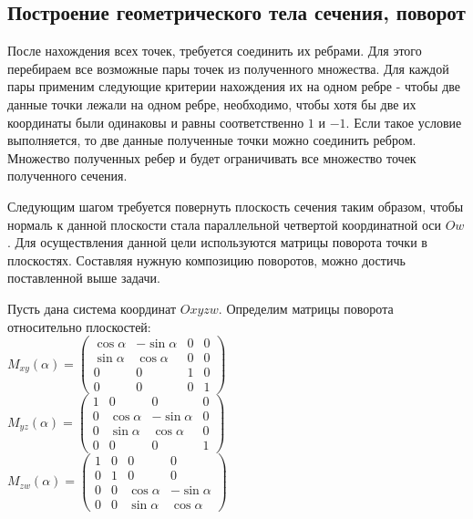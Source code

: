 \documentclass[12pt, a4paper, twoside]{report}
\begin{document}
\subsection{Построение геометрического тела сечения, поворот}
После нахождения всех точек, требуется соединить их ребрами. Для этого перебираем все возможные пары точек из полученного множества. Для каждой пары применим следующие критерии нахождения их на одном ребре - чтобы две данные точки лежали на одном ребре, необходимо, чтобы хотя бы две их координаты были одинаковы и равны соответственно $1$ и $-1$.
Если такое условие выполняется, то две данные полученные точки можно соединить ребром. Множество полученных ребер и будет ограничивать все множество точек полученного сечения.

Следующим шагом требуется повернуть плоскость сечения таким образом, чтобы нормаль к данной плоскости стала параллельной четвертой координатной оси $Ow$. Для осуществления данной цели используются матрицы поворота точки в плоскостях. Составляя нужную композицию поворотов, можно достичь поставленной выше задачи.

Пусть дана система координат $Oxyzw$. Определим матрицы поворота относительно плоскостей:
\\
$
M_{xy}(\alpha)=
\begin{equation}
	\left(
	\begin{array}{cccc}
		\cos \alpha & -\sin \alpha & 0 & 0 \\
		\sin \alpha & \cos \alpha & 0 & 0 \\
		0 & 0 & 1 & 0 \\
		0 & 0 & 0 & 1
	\end{array}\right)
\end{equation}
$
\\ 

$
M_{yz}(\alpha)=
\begin{equation}
	\left(
	\begin{array}{cccc}
		1 & 0 & 0 & 0 \\
		0 & \cos \alpha & -\sin \alpha & 0 \\
		0 & \sin \alpha & \cos \alpha & 0 \\
		0 & 0 & 0 & 1
	\end{array}\right)
\end{equation}
$
\\

$
M_{zw}(\alpha)=
	\begin{equation}
	\left(
	\begin{array}{cccc}
																				1 & 0 & 0 & 0 \\
																				0 & 1 & 0 & 0 \\
																				0 & 0 & \cos \alpha & -\sin \alpha \\
																				0 & 0 & \sin \alpha & \cos \alpha
	\end{array}\right)
	\end{equation}
$
\\
\end{document}
